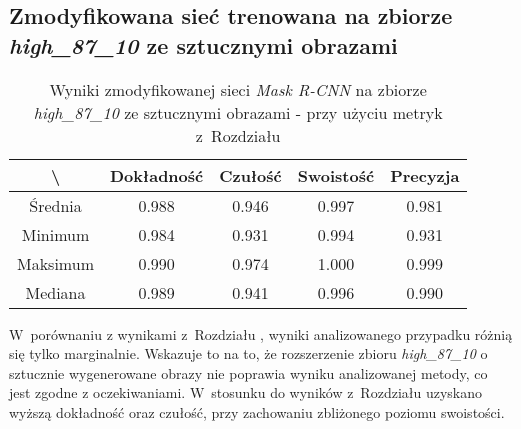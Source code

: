 \subsection{Zmodyfikowana sieć trenowana na zbiorze \textit{high\_87\_10} ze sztucznymi obrazami}
\label{sec:results_high_modified_generated}

\begin{table}[H]
	\centering
	\caption{Wyniki zmodyfikowanej sieci \textit{Mask R-CNN} na zbiorze \textit{high\_87\_10} ze sztucznymi obrazami - przy użyciu metryk z~Rozdziału }
	\vspace{6pt}
	{\footnotesize
		\begin{tabular}{|c|c|c|c|c|}
      \hline \textbackslash & Dokładność & Czułość & Swoistość & Precyzja \\
      \hline Średnia & 0.988 & 0.946 & 0.997 & 0.981 \\
      \hline Minimum & 0.984 & 0.931 & 0.994 & 0.931 \\
      \hline Maksimum & 0.990 & 0.974 & 1.000 & 0.999 \\
      \hline Mediana & 0.989 & 0.941 & 0.996 & 0.990 \\
      \hline
		\end{tabular}
	}
  \vspace{0pt}
  \label{Tab:high_modified_generated_calculated}
\end{table}

W~porównaniu z wynikami z~Rozdziału , wyniki analizowanego przypadku różnią się tylko marginalnie. Wskazuje to na to, że rozszerzenie zbioru \textit{high\_87\_10} o sztucznie wygenerowane obrazy nie poprawia wyniku analizowanej metody, co jest zgodne z oczekiwaniami.
W~stosunku do wyników z~Rozdziału  uzyskano wyższą dokładność oraz czułość, przy zachowaniu zbliżonego poziomu swoistości.
